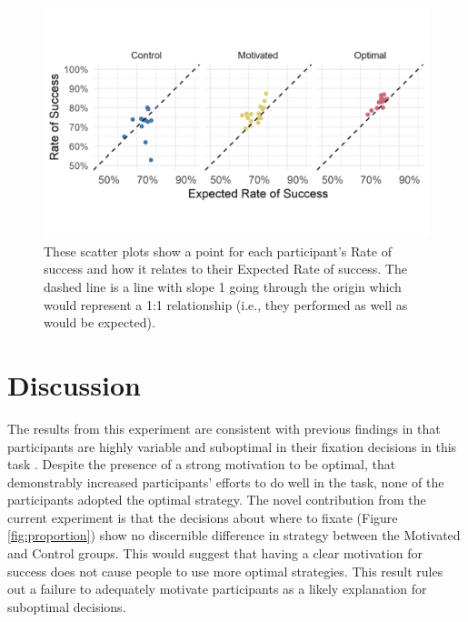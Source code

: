 \documentclass[vision,article,submit,moreauthors,pdftex,10pt,a4paper]{mdpi}
\begin{document}
\begin{figure}[H]
	\centering
	\includegraphics[width=12 cm]{../Figures/exp_raw_scatter.png}
	\caption{These scatter plots show a point for each participant’s Rate of success and how it relates to their Expected Rate of success. The dashed line is a line with slope 1 going through the origin which would represent a 1:1 relationship (i.e., they performed as well as would be expected).}
	\label{fig:scatter}
\end{figure} 




\section{Discussion}

The results from this experiment are consistent with previous findings in that participants are highly variable and suboptimal in their fixation decisions in this task \cite{morvan2012human,clarke2015failure}. Despite the presence of a strong motivation to be optimal, that demonstrably increased participants’ efforts to do well in the task, none of the participants adopted the optimal strategy. The novel contribution from the current experiment is that the decisions about where to fixate (Figure \ref{fig:proportion}) show no discernible difference in strategy between the Motivated and Control groups. This would suggest that having a clear motivation for success does not cause people to use more optimal strategies. This result rules out a failure to adequately motivate participants as a likely explanation for suboptimal decisions. 
\end{document}
